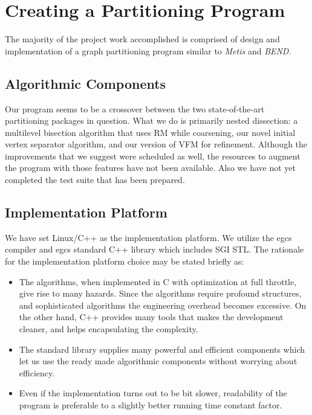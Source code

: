 \documentclass[a4paper,12pt]{article}
\begin{document}
\section{Creating a Partitioning Program}

The majority of the project work accomplished is comprised of design and
implementation of a graph partitioning program similar to
\textsl{Metis} and \textsl{BEND}.

\subsection{Algorithmic Components}

Our program seems to be a crossover between the two state-of-the-art
partitioning packages in question. What we do is primarily nested
dissection: a multilevel bisection algorithm that uses RM while
coarsening, our novel initial vertex separator algorithm, and our
version of VFM for refinement. Although the improvements that we
suggest were scheduled as well, the resources to augment the program
with those features have not been available. Also we have not yet
completed the test suite that has been prepared.

\subsection{Implementation Platform}

We have set Linux/C++ as the implementation platform. We utilize the
egcs compiler and egcs standard C++ library which includes SGI STL.
The rationale for the implementation platform choice may be stated
briefly as:
\begin{itemize}
\item The algorithms, when implemented in C with optimization at full
throttle, give rise to many hazards. Since the algorithms require profound
structures, and sophisticated algorithms the engineering overhead
becomes excessive. On the other hand, C++ provides many tools that
makes the development cleaner, and helps encapsulating the complexity.
\item The standard library supplies many powerful and efficient
components which let us use the ready made algorithmic components
without worrying about efficiency.
\item Even if the implementation turns out to be bit slower, 
readability of the program is preferable to a slightly better
running time constant factor.
\end{itemize}
\end{document}

